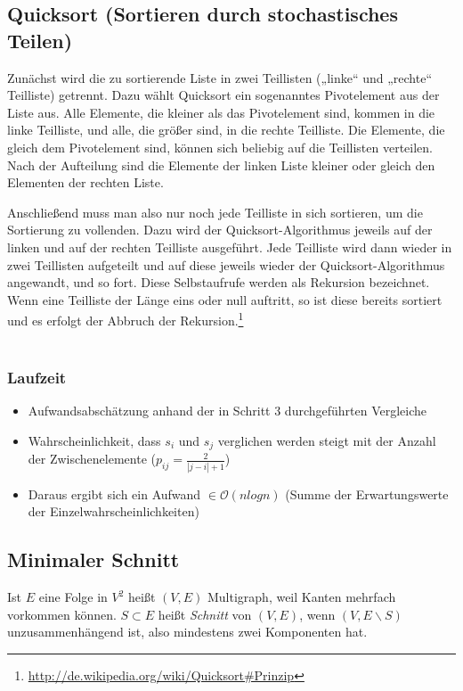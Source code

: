 \subsection{Quicksort (Sortieren durch stochastisches Teilen)}
Zunächst wird die zu sortierende Liste in zwei Teillisten („linke“ und „rechte“ Teilliste) getrennt. Dazu wählt Quicksort ein sogenanntes Pivotelement aus der Liste aus. Alle Elemente, die kleiner als das Pivotelement sind, kommen in die linke Teilliste, und alle, die größer sind, in die rechte Teilliste. Die Elemente, die gleich dem Pivotelement sind, können sich beliebig auf die Teillisten verteilen. Nach der Aufteilung sind die Elemente der linken Liste kleiner oder gleich den Elementen der rechten Liste.

Anschließend muss man also nur noch jede Teilliste in sich sortieren, um die Sortierung zu vollenden. Dazu wird der Quicksort-Algorithmus jeweils auf der linken und auf der rechten Teilliste ausgeführt. Jede Teilliste wird dann wieder in zwei Teillisten aufgeteilt und auf diese jeweils wieder der Quicksort-Algorithmus angewandt, und so fort. Diese Selbstaufrufe werden als Rekursion bezeichnet. Wenn eine Teilliste der Länge eins oder null auftritt, so ist diese bereits sortiert und es erfolgt der Abbruch der Rekursion.\footnote{\url{http://de.wikipedia.org/wiki/Quicksort\#Prinzip}}
\text{}\\\\


\subsubsection{Laufzeit}
\begin{itemize}
	\item Aufwandsabschätzung anhand der in Schritt 3 durchgeführten Vergleiche
	\item Wahrscheinlichkeit, dass \(s_i\) und \(s_j\) verglichen werden steigt mit der Anzahl der Zwischenelemente (\(p_{ij}=\frac{2}{|j-i|+1}\))
	\item Daraus ergibt sich ein Aufwand \(\in \mathcal{O}(nlogn)\) (Summe der Erwartungswerte der Einzelwahrscheinlichkeiten)
\end{itemize}


\subsection{Minimaler Schnitt}
Ist \(E\) eine Folge in \(V^2\) heißt \((V,E)\) Multigraph, weil Kanten mehrfach vorkommen können. \(S \subset E\) heißt \textit{Schnitt} von \((V,E)\), wenn \((V, E \backslash S)\) unzusammenhängend ist, also mindestens zwei Komponenten hat.
\text{}\\



